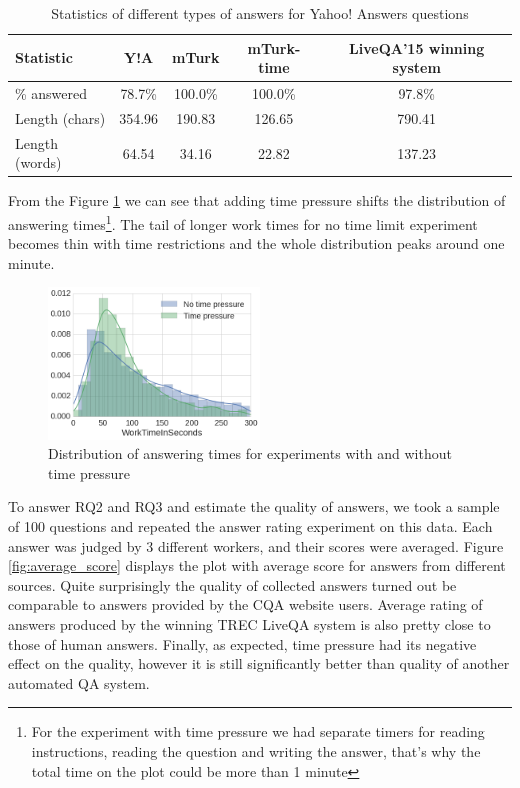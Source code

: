 \documentclass[11pt,letterpaper]{article}
\begin{document}
\begin{table}[h!t]
\centering
\caption{Statistics of different types of answers for Yahoo! Answers questions}
\begin{tabular}{| p{3cm} | c | c | c | c |}
\hline
Statistic & Y!A & mTurk & mTurk-time & LiveQA'15 winning system\\
\hline
\% answered & 78.7\% & 100.0\% & 100.0\% & 97.8\% \\
Length (chars) & 354.96 & 190.83 & 126.65 & 790.41 \\
Length (words) & 64.54 & 34.16 & 22.82 & 137.23 \\
\hline
\end{tabular}
\label{table:answer_stats}
\end{table}

From the Figure \ref{fig:answering_time_distribution} we can see that adding time pressure shifts the distribution of answering times\footnote{For the experiment with time pressure we had separate timers for reading instructions, reading the question and writing the answer, that's why the total time on the plot could be more than 1 minute}.
The tail of longer work times for no time limit experiment becomes thin with time restrictions and the whole distribution peaks around one minute.

\begin{figure}[h]
	\centering
	\includegraphics[width=0.5\textwidth]{img/answering_time_distribution}
	\caption{Distribution of answering times for experiments with and without time pressure}
	\label{fig:answering_time_distribution}
\end{figure}

To answer RQ2 and RQ3 and estimate the quality of answers, we took a sample of 100 questions and repeated the answer rating experiment on this data.
Each answer was judged by 3 different workers, and their scores were averaged.
Figure \ref{fig:average_score} displays the plot with average score for answers from different sources.
Quite surprisingly the quality of collected answers turned out be comparable to answers provided by the CQA website users.
Average rating of answers produced by the winning TREC LiveQA system is also pretty close to those of human answers.
Finally, as expected, time pressure had its negative effect on the quality, however it is still significantly better than quality of another automated QA system.
\end{document}

